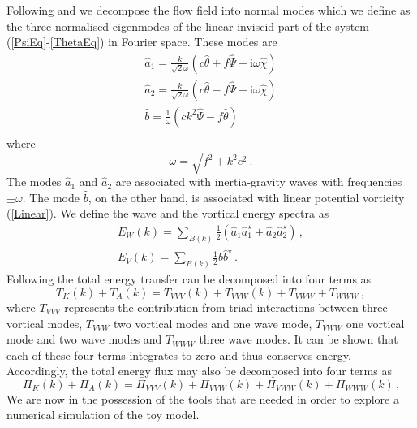  Following \citet{Bartello:1995} and \citet{Dritschel2001} we decompose the flow field into normal  modes which we define as the three normalised eigenmodes of the linear inviscid part of the system (\ref{PsiEq}-\ref{ThetaEq}) in Fourier space. These modes are
\begin{eqnarray}
\widehat{a}_{1} = \frac{k}{\sqrt{2} \omega} ( c \widehat{\theta} + f \widehat{\Psi} - {\mbox{i}} \omega \widehat{\chi} )  \\
\widehat{a}_{2} =  \frac{k}{\sqrt{2} \omega} ( c \widehat{\theta} - f \widehat{\Psi} + {\mbox{i}} \omega \widehat{\chi} ) \\
\widehat{b} =  \frac{1}{\omega} (c k^2 \widehat{\Psi}-f \widehat{\theta}   ) \\
\end{eqnarray}
where
\begin{equation} \label{Dispersion}
\omega =  \sqrt{f^2+k^2c^2}  \, .
\end{equation}
The modes $ \widehat{a}_{1} $ and $ \widehat{a}_{2} $ are associated with inertia-gravity waves with frequencies $ \pm \omega $.
The mode $ \widehat{b} $, on the other hand,  is associated with linear potential vorticity (\ref{Linear}).
We define the wave and the vortical energy spectra as
\begin{eqnarray}
E_{W}(k) = \sum_{B(k)} \frac{1}{2}(\widehat{a}_{1} \widehat{a}_{1}^{\star} + \widehat{a}_{2} \widehat{a}_{2}^{\star} ) \, , \\
E_{V}(k) =  \sum_{B(k)} \frac{1}{2} \widehat{b} \widehat{b} ^{\star} \, .
\end{eqnarray}
{ \noindent Following \citet{Deusebio-Vallgren-Lindborg:2013} the total energy transfer can be decomposed into four terms as
\begin{equation}
T_K(k) + T_A(k) = T_{VVV}(k) + T_{VVW}(k) + T_{VWW} + T_{WWW} \, ,
\end{equation}
where
$ T_{VVV} $ represents the contribution from triad interactions between three vortical modes, $ T_{VVW} $  two vortical modes and one wave mode,  $ T_{VWW} $ one vortical mode and two wave modes and $ T_{WWW} $ three wave modes.  It can be shown that each of these four  terms integrates to zero and  thus conserves energy. Accordingly, the total energy flux may  also be decomposed into four terms as
\begin{equation} \label{Decomposition}
\Pi_K(k) + \Pi_A(k) = \Pi_{VVV}(k)+ \Pi_{VVW}(k)+\Pi_{VWW}(k)+ \Pi_{WWW}(k) \, .
\end{equation} }
\noindent We are now in the possession of the tools that are needed in order to explore a numerical simulation of the toy model.

